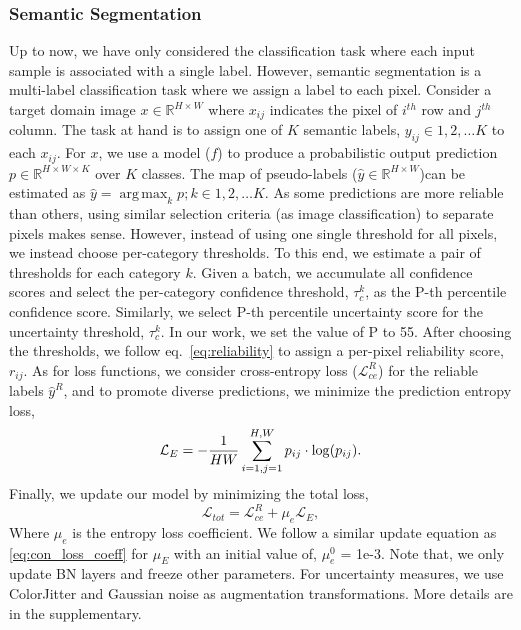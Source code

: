 \documentclass[10pt,twocolumn,letterpaper]{article}
\DeclareMathOperator*{\argmax}{arg\, max}
\begin{document}
\subsubsection{Semantic Segmentation}
\vspace{-1mm}
Up to now, we have only considered the classification task where each input sample is associated with a single label. However, semantic segmentation is a multi-label classification task where we assign a label to each pixel. Consider a target domain image $x \in \mathbb{R}^{H \times W}$ where $x_{ij}$ indicates the pixel of $i^{th}$ row and $j^{th}$ column. The task at hand is to assign one of $K$ semantic labels, $y_{ij} \in {1,2, \ldots K}$ to each $x_{ij}$. For $x$, we use a model ($f$) to produce a probabilistic output prediction $p \in \mathbb{R}^{H \times W \times K}$ over $K$ classes. The map of pseudo-labels ($\hat{y} \in \mathbb{R}^{H \times W}$)can be estimated as $\hat{y} = \argmax_{k} p; k \in {1,2, \ldots K}$. As some predictions are more reliable than others, using similar selection criteria (as image classification) to separate pixels makes sense. However, instead of using one single threshold for all pixels, we instead choose per-category thresholds. To this end, we estimate a pair of thresholds for each category $k$. Given a batch, we accumulate all confidence scores and select the per-category confidence threshold, $\tau_c^k$, as the P-th percentile confidence score. Similarly, we select P-th percentile uncertainty score for the uncertainty threshold, $\tau_c^k$. In our work, we set the value of P to 55. After choosing the thresholds, we follow eq.~\ref{eq:reliability} to assign a per-pixel reliability score, $r_{ij}$. As for loss functions, we consider cross-entropy loss ($\mathcal{L}^R_{ce}$) for the reliable labels $\hat{y}^R$, and to promote diverse predictions, we minimize the prediction entropy loss,
\begin{equation}
    \vspace{-0.5mm}
    \mathcal{L}_{E} = - \frac{1}{HW}\sum_{i=1,j=1}^{H,W} p_{ij} \cdot \log(p_{ij}). \label{eq:entropy}
    \vspace{-0.5mm}
\end{equation}
Finally, we update our model by minimizing the total loss,
\begin{equation}
    \mathcal{L}_{tot} = \mathcal{L}^R_{ce} + \mu_{e} \mathcal{L}_{E},
\end{equation}
Where $\mu_{e}$ is the entropy loss coefficient. We follow a similar update equation as \ref{eq:con_loss_coeff} for $\mu_E$ with an initial value of, $\mu^0_e$ = 1e-3. Note that, we only update BN layers and freeze other parameters. For uncertainty measures, we use ColorJitter and Gaussian noise as augmentation transformations. More details are in the supplementary.
\end{document}

